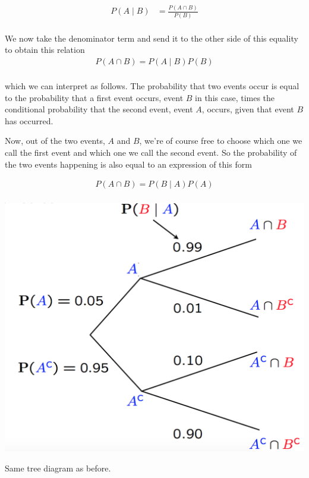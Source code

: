 \documentclass{tufte-handout}
\begin{document}
\begin{align*}
P(A \mid B) &= \frac{P(A \cap B)} {P(B) }\\
\end{align*}

We now take the denominator term and send it to
the other side of this equality to obtain this relation
\begin{align*}
P(A \cap B) = P(A \mid B) P(B)\\
\end{align*}

\noindent which we can interpret as follows. The probability
that two events occur is equal to the probability that a first event occurs, event $B$ in this case, times the
conditional probability that the second event, event $A$, occurs, given that event $B$ has occurred.

Now, out of the two events, $A$ and $B$, we're of course free to choose which one we call the first event
and which one we call the second event. So the probability of the two events happening is also equal to
an expression of this form

\begin{align*}
P(A \cap B) = P(B \mid A) P(A) \\
\end{align*}



\begin{marginfigure}
  \includegraphics{TreeAgain}
  \caption{Same tree diagram as before.}
\end{marginfigure}
\end{document}

